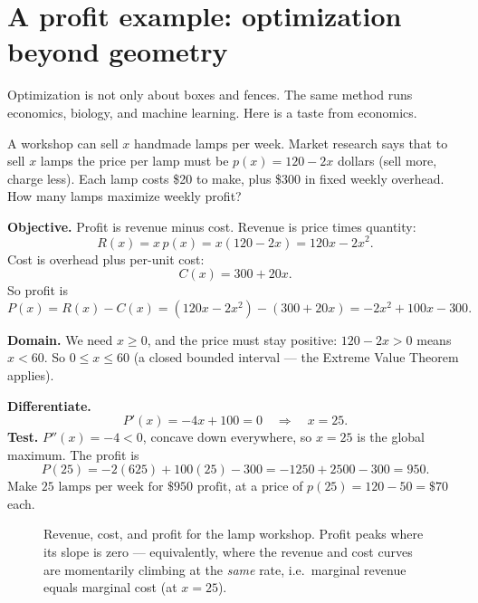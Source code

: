 \section{A profit example: optimization beyond geometry}

Optimization is not only about boxes and fences. The same method runs economics,
biology, and machine learning. Here is a taste from economics.

\begin{example}\label{ch17:ex-profit}
A workshop can sell $x$ handmade lamps per week. Market research says that to sell $x$
lamps the price per lamp must be $p(x) = 120 - 2x$ dollars (sell more, charge less).
Each lamp costs \$20 to make, plus \$300 in fixed weekly overhead. How many lamps
maximize weekly profit?
\end{example}

\textbf{Objective.} Profit is revenue minus cost. Revenue is price times quantity:
\[
R(x) = x\,p(x) = x(120 - 2x) = 120x - 2x^2.
\]
Cost is overhead plus per-unit cost:
\[
C(x) = 300 + 20x.
\]
So profit is
\[
P(x) = R(x) - C(x) = (120x - 2x^2) - (300 + 20x) = -2x^2 + 100x - 300.
\]

\textbf{Domain.} We need $x\ge 0$, and the price must stay positive: $120-2x>0$ means
$x<60$. So $0 \le x \le 60$ (a closed bounded interval --- the Extreme Value Theorem
applies).

\textbf{Differentiate.}
\[
P'(x) = -4x + 100 = 0 \quad\Longrightarrow\quad x = 25.
\]
\textbf{Test.} $P''(x) = -4 < 0$, concave down everywhere, so $x=25$ is the global
maximum. The profit is
\[
P(25) = -2(625) + 100(25) - 300 = -1250 + 2500 - 300 = 950.
\]
Make $\boxed{25\text{ lamps per week for \$950 profit}}$, at a price of
$p(25) = 120 - 50 = \$70$ each.

\begin{figure}[H]
\centering
{}
\caption{Revenue, cost, and profit for the lamp workshop. Profit peaks where its slope
is zero --- equivalently, where the revenue and cost curves are momentarily climbing at
the \emph{same} rate, i.e.\ marginal revenue equals marginal cost (at $x=25$).}
\label{ch17:fig-profit}
\end{figure}

